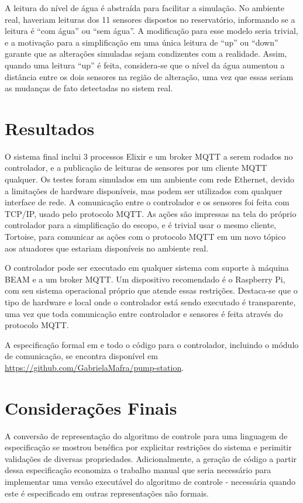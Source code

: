 \documentclass[12pt]{article}
\begin{document}
A leitura do nível de água é abstraída para facilitar a simulação. No ambiente
real, haveriam leituras dos 11 sensores dispostos no reservatório, informando se
a leitura é ``com água'' ou ``sem água''. A modificação para esse modelo seria
trivial, e a motivação para a simplificação em uma única leitura de ``up'' ou
``down'' garante que as alterações simuladas sejam condizentes com a realidade.
Assim, quando uma leitura ``up'' é feita, considera-se que o nível da água
aumentou a distância entre os dois sensores na região de alteração, uma vez que
essas seriam as mudanças de fato detectadas no sistem real.

\section{Resultados}

O sistema final inclui 3 processos Elixir e um broker MQTT a serem rodados no
controlador, e a publicação de leituras de sensores por um cliente MQTT
qualquer. Os testes foram simulados em um ambiente com rede Ethernet, devido a
limitações de hardware disponíveis, mas podem ser utilizados com qualquer
interface de rede. A comunicação entre o controlador e os sensores foi feita com
TCP/IP, usado pelo protocolo MQTT. As ações são impressas na tela do próprio
controlador para a simplificação do escopo, e é trivial usar o mesmo cliente,
Tortoise, para comunicar as ações com o protocolo MQTT em um novo tópico aos
atuadores que estariam disponíveis no ambiente real.

O controlador pode ser executado em qualquer sistema com suporte à máquina BEAM
e a um broker MQTT. Um dispositivo recomendado é o Raspberry Pi, com seu sistema
operacional próprio que atende essas restrições. Destaca-se que o tipo de
hardware e local onde o controlador está sendo executado é transparente, uma vez
que toda comunicação entre controlador e sensores é feita através do protocolo
MQTT.

A especificação formal em \TLA e todo o código para o controlador, incluindo o
módulo de comunicação, se encontra disponível em \url{https://github.com/GabrielaMafra/pump-station}.

\section{Considerações Finais}

A conversão de representação do algoritmo de controle para uma linguagem de
especificação se mostrou benéfica por explicitar restrições do sistema e
perimitir validações de diversas propriedades. Adicionalmente, a geração de
código a partir dessa especificação economiza o trabalho manual que seria
necessário para implementar uma versão executável do algoritmo de controle -
necessária quando este é especificado em outras representações não formais.
\end{document}
